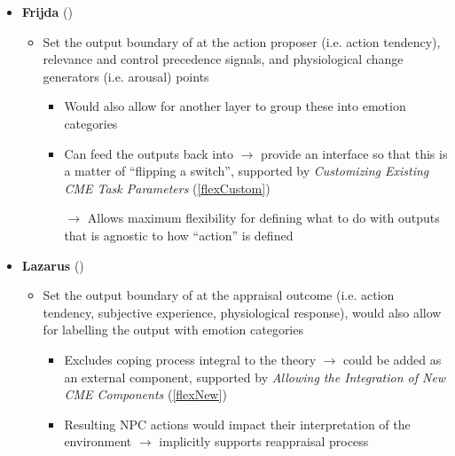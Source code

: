 \begin{itemize}
    \item \textbf{Frijda} (\strong)
    \begin{itemize}
        \item Set the output boundary of \progname{} at the action proposer
        (i.e. action tendency), relevance and control precedence signals, and
        physiological change generators (i.e. arousal)
        points~\citep[p.~455]{frijda1986emotions}
        \begin{itemize}
            \item Would also allow for another layer to group these into
            emotion categories~\citep[p.~72]{frijda1986emotions}

            \item Can feed the outputs back into \progname{} $\rightarrow$
            provide an interface so that this is a matter of ``flipping a
            switch'', supported by \textit{Customizing Existing CME Task
                Parameters} (\ref{flexCustom})

            \item [$\rightarrow$] Allows maximum flexibility for defining what
            to do with outputs that is agnostic to how ``action'' is defined
        \end{itemize}
    \end{itemize}

    \item \textbf{Lazarus} (\strong)
    \begin{itemize}
        \item Set the output boundary of \progname{} at the appraisal outcome
        (i.e. action tendency, subjective experience, physiological response),
        would also allow for labelling the output with emotion
        categories~\citep[p.~209--210]{lazarus1991emotion}
        \begin{itemize}
            \item Excludes coping process integral to the theory $\rightarrow$
            could be added as an external component, supported by
            \textit{Allowing the Integration of New CME Components}
            (\ref{flexNew})

            \item Resulting NPC actions would impact their interpretation of
            the environment $\rightarrow$ implicitly supports reappraisal
            process~\citep[p.~134]{lazarus1991emotion}


\end{itemize}
\end{itemize}
\end{itemize}
